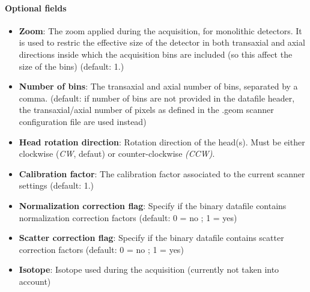 \documentclass[a4paper, 11pt]{article}
\begin{document}
\paragraph{Optional fields}
\begin{itemize}
  \item \textbf{Zoom}: The zoom applied during the acquisition, for monolithic detectors. It is used to restric the effective size of the detector in both transaxial and axial directions inside which the acquisition bins are included (so this affect the size of the bins) (default: 1.)
  \item \textbf{Number of bins}: The transaxial and axial number of bins, separated by a comma. (default: if number of bins are not provided in the datafile header, the transaxial/axial number of pixels as defined in the .geom scanner configuration file are used instead)
  \item \textbf{Head rotation direction}: Rotation direction of the head(s). Must be either clockwise (\textit{CW}, defaut) or counter-clockwise \textit{(CCW)}.
  \item \textbf{Calibration factor}: The calibration factor associated to the current scanner settings (default: 1.)
  \item \textbf{Normalization correction flag}: Specify if the binary datafile contains normalization correction factors (default: 0 = no ; 1 = yes)
  \item \textbf{Scatter correction flag}: Specify if the binary datafile contains scatter correction factors (default: 0 = no ; 1 = yes)
  \item \textbf{Isotope}: Isotope used during the acquisition (currently not taken into account)
\end{itemize}
\end{document}
